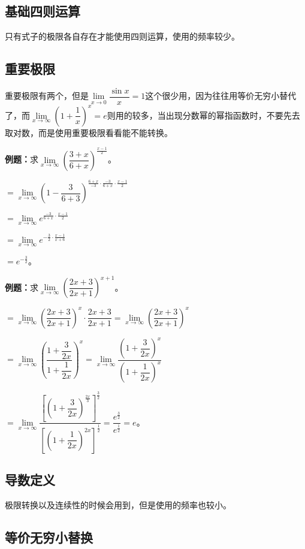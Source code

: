\documentclass[UTF8, 12pt]{ctexart}
\begin{document}
\subsection{基础四则运算}

只有式子的极限各自存在才能使用四则运算，使用的频率较少。

\subsection{重要极限}

重要极限有两个，但是$\lim\limits_{x\to 0}\dfrac{\sin x}{x}=1$这个很少用，因为往往用等价无穷小替代了，而$\lim\limits_{x\to\infty}\left(1+\dfrac{1}{x}\right)^x=e$则用的较多，当出现分数幂的幂指函数时，不要先去取对数，而是使用重要极限看看能不能转换。\medskip

\textbf{例题：}求$\lim\limits_{x\to\infty}\left(\dfrac{3+x}{6+x}\right)^{\frac{x-1}{2}}$。

$=\lim\limits_{x\to\infty}\left(1-\dfrac{3}{6+3}\right)^{\frac{6+x}{-3}\cdot\frac{-3}{6+x}\cdot\frac{x-1}{2}}$

$=\lim\limits_{x\to\infty}e^{\frac{-3}{6+x}\cdot\frac{x-1}{2}}$

$=\lim\limits_{x\to\infty}e^{-\frac{3}{2}\cdot\frac{x-1}{x+6}}$

$=e^{-\frac{3}{2}}$。

\textbf{例题：}求$\lim\limits_{x\to\infty}\left(\dfrac{2x+3}{2x+1}\right)^{x+1}$。\medskip

$=\lim\limits_{x\to\infty}\left(\dfrac{2x+3}{2x+1}\right)^x\cdot\dfrac{2x+3}{2x+1}=\lim\limits_{x\to\infty}\left(\dfrac{2x+3}{2x+1}\right)^x$\medskip

$=\lim\limits_{x\to\infty}\left(\dfrac{1+\dfrac{3}{2x}}{1+\dfrac{1}{2x}}\right)^x=\lim\limits_{x\to\infty}\dfrac{\left(1+\dfrac{3}{2x}\right)^x}{\left(1+\dfrac{1}{2x}\right)^x}$

$=\lim\limits_{x\to\infty}\dfrac{\left[\left(1+\dfrac{3}{2x}\right)^{\frac{2x}{3}}\right]^{\frac{3}{2}}}{\left[\left(1+\dfrac{1}{2x}\right)^{2x}\right]^{\frac{1}{2}}}=\dfrac{e^{\frac{3}{2}}}{e^{\frac{1}{2}}}=e$。

\subsection{导数定义}

极限转换以及连续性的时候会用到，但是使用的频率也较小。

\subsection{等价无穷小替换}
\end{document}
